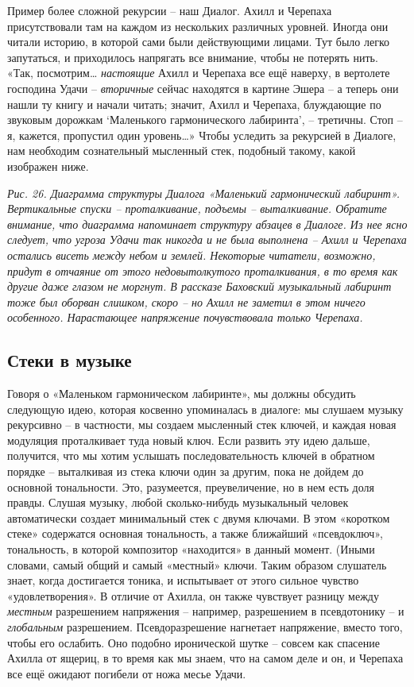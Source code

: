 \documentclass[../main.tex]{subfiles}
\begin{document}
Пример более сложной рекурсии \--- наш Диалог. Ахилл и Черепаха присутствовали там на каждом из нескольких различных уровней. Иногда они читали историю, в которой сами были действующими лицами. Тут было легко запутаться, и приходилось напрягать все внимание, чтобы не потерять нить. «Так, посмотрим\ldots{} \emph{настоящие} Ахилл и Черепаха все ещё наверху, в вертолете господина Удачи \--- \emph{вторичные} сейчас находятся в картине Эшера \--- а теперь они нашли ту книгу и начали читать; значит, Ахилл и Черепаха, блуждающие по звуковым дорожкам \enquote*{Маленького гармонического лабиринта}, \--- третичны. Стоп \--- я, кажется, пропустил один уровень\ldots» Чтобы уследить за рекурсией в Диалоге, нам необходим сознательный мысленный стек, подобный такому, какой изображен ниже.

\emph{Рис. 26. Диаграмма структуры Диалога «Маленький гармонический лабиринт». Вертикальные спуски \--- проталкивание, подъемы \--- выталкивание. Обратите внимание, что диаграмма напоминает структуру абзацев в Диалоге. Из нее ясно следует, что угроза Удачи так никогда и не была выполнена \--- Ахилл и Черепаха остались висеть между небом и землей. Некоторые читатели, возможно, придут в отчаяние от этого недовытолкутого проталкивания, в то время как другие даже глазом не моргнут. В рассказе Баховский музыкальный лабиринт тоже был оборван слишком, скоро \--- но Ахилл не заметил в этом ничего особенного. Нарастающее напряжение почувствовала только Черепаха.}


\subsection{Стеки в музыке}

Говоря о «Маленьком гармоническом лабиринте», мы должны обсудить следующую идею, которая косвенно упоминалась в диалоге: мы слушаем музыку рекурсивно \--- в частности, мы создаем мысленный стек ключей, и каждая новая модуляция проталкивает туда новый ключ. Если развить эту идею дальше, получится, что мы хотим услышать последовательность ключей в обратном порядке \--- выталкивая из стека ключи один за другим, пока не дойдем до основной тональности. Это, разумеется, преувеличение, но в нем есть доля правды. Слушая музыку, любой сколько-нибудь музыкальный человек автоматически создает минимальный стек с двумя ключами. В этом «коротком стеке» содержатся основная тональность, а также ближайший «псевдоключ», тональность, в которой композитор «находится» в данный момент. (Иными словами, самый общий и самый «местный» ключи. Таким образом слушатель знает, когда достигается тоника, и испытывает от этого сильное чувство «удовлетворения». В отличие от Ахилла, он также чувствует разницу между \emph{местным} разрешением напряжения \--- например, разрешением в псевдотонику \--- и \emph{глобальным} разрешением. Псевдоразрешение нагнетает напряжение, вместо того, чтобы его ослабить. Оно подобно иронической шутке \--- совсем как спасение Ахилла от ящериц, в то время как мы знаем, что на самом деле и он, и Черепаха все ещё ожидают погибели от ножа месье Удачи.
\end{document}
